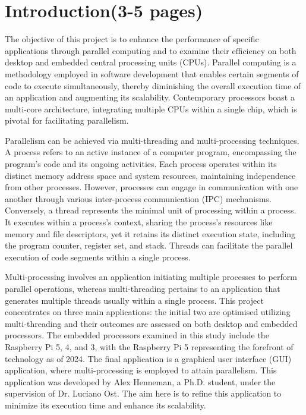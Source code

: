 \documentclass[12pt, openany]{book}
\begin{document}
\newpage
\tableofcontents

\chapter{Introduction(3-5 pages)}
The objective of this project is to enhance the performance of specific applications through parallel computing and to examine their efficiency on both desktop and embedded central processing units (CPUs). Parallel computing is a methodology employed in software development that enables certain segments of code to execute simultaneously, thereby diminishing the overall execution time of an application and augmenting its scalability. Contemporary processors boast a multi-core architecture, integrating multiple CPUs within a single chip, which is pivotal for facilitating parallelism\cite{modern_processors}.  

Parallelism can be achieved via multi-threading and multi-processing techniques. A process refers to an active instance of a computer program, encompassing the program's code and its ongoing activities. Each process operates within its distinct memory address space and system resources, maintaining independence from other processes. However, processes can engage in communication with one another through various inter-process communication (IPC) mechanisms. Conversely, a thread represents the minimal unit of processing within a process. It executes within a process's context, sharing the process’s resources like memory and file descriptors, yet it retains its distinct execution state, including the program counter, register set, and stack. Threads can facilitate the parallel execution of code segments within a single process\cite{multi_processing_multi_threading_article}.

Multi-processing involves an application initiating multiple processes to perform parallel operations, whereas multi-threading pertains to an application that generates multiple threads usually within a single process. This project concentrates on three main applications: the initial two are optimised utilizing multi-threading and their outcomes are assessed on both desktop and embedded processors. The embedded processors examined in this study include the Raspberry Pi 5, 4, and 3, with the Raspberry Pi 5 representing the forefront of technology as of 2024. The final application is a graphical user interface (GUI) application, where multi-processing is employed to attain parallelism. This application was developed by Alex Henneman, a Ph.D. student, under the supervision of Dr. Luciano Ost\cite{debate_fi_publication}. The aim here is to refine this application to minimize its execution time and enhance its scalability. 
\end{document}
